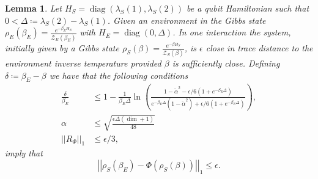 \documentclass{article}
\newtheorem{lemma}[theorem]{Lemma}
\newcommand{\norm}[1]{\left| \left| #1 \right| \right|}
\newcommand{\partfun}{\mathcal{Z}}
\DeclareMathOperator{\diag}{diag}
\begin{document}
\begin{lemma} \label{lem:single_qubit_one_interaction}
    Let $H_S = \diag(\lambda_S(1), \lambda_S(2))$ be a qubit Hamiltonian such that $0 < \Delta \coloneqq \lambda_S(2) - \lambda_S(1)$. Given an environment in the Gibbs state $\rho_E(\beta_E) = \frac{e^{-\beta_E H_E}}{\partfun_E(\beta_E)}$ with $H_E = \diag(0, \Delta)$. In one interaction the system, initially given by a Gibbs state $\rho_S(\beta) = \frac{e^{-\beta H_S}}{\partfun_S(\beta)}$, is $\epsilon$ close in trace distance to the environment inverse temperature provided $\beta$ is sufficiently close. Defining $\delta \coloneqq \beta_E - \beta$ we have that the following conditions
\begin{align}
    \frac{\delta}{\beta_E} &\le 1 - \frac{1}{\beta_E \Delta}  \ln \left( \frac{1 - \widetilde{\alpha}^2 - \epsilon/ 6(1  + e^{-\beta_E \Delta})}{e^{-\beta_E \Delta}(1 - \widetilde{\alpha}^2) + \epsilon / 6 (1 + e^{-\beta_E \Delta})}\right), \\
    \alpha &\leq \sqrt{\frac{ \epsilon \Delta (\dim + 1) }{48}} \\
    \norm{R_{\Phi}}_1 &\leq \epsilon / 3,
\end{align}
imply that 
$$\norm{\rho_S(\beta_E) - \Phi(\rho_S(\beta))}_1 \leq \epsilon.$$
\end{lemma}
\end{document}
